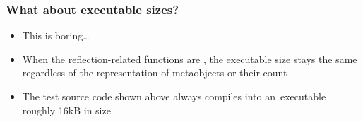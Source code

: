 \documentclass[compress,table,xcolor=table]{beamer}
\begin{document}
\begin{frame}
  \frametitle{What about executable sizes?}
  \Large
  \begin{itemize}
    \item This is boring\ldots
    \item When the reflection-related functions are ,
      the executable size stays the same regardless of the representation
      of metaobjects or their count
    \item The test source code shown above always compiles into an~executable
      roughly 16kB  in size

  \end{itemize}
\end{frame}
\end{document}
